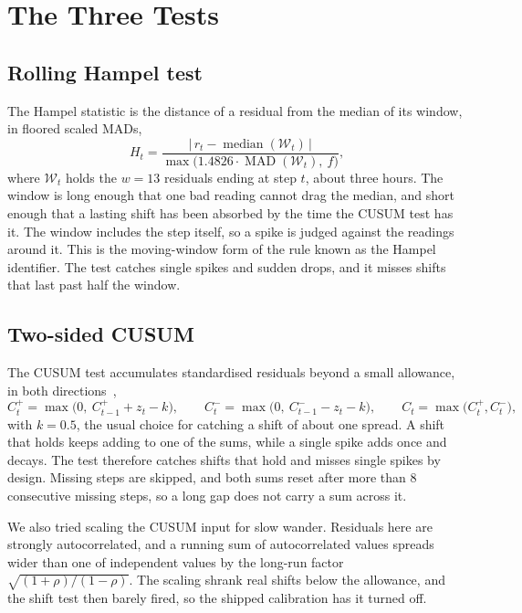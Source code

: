 \documentclass{article}
\begin{document}
\section{The Three Tests}
\label{sec:tests}

\subsection{Rolling Hampel test}
\label{sec:hampel}

The Hampel statistic is the distance of a residual from the median of its
window, in floored scaled MADs,
\begin{equation}
  H_{t} = \frac{\big|\, r_{t} - \operatorname{median}(\mathcal{W}_{t}) \,\big|}
               {\max\!\big(1.4826 \cdot \operatorname{MAD}(\mathcal{W}_{t}),\ f\big)} ,
\end{equation}
where $\mathcal{W}_{t}$ holds the $w = 13$ residuals ending at step $t$, about
three hours. The window is long enough that one bad reading cannot drag the
median, and short enough that a lasting shift has been absorbed by the time the
CUSUM test has it. The window includes the step itself, so a spike is judged
against the readings around it. This is the moving-window form of the rule
known as the Hampel identifier. The test catches single spikes and sudden
drops, and it misses shifts that last past half the window.

\subsection{Two-sided CUSUM}
\label{sec:cusum}

The CUSUM test accumulates standardised residuals beyond a small allowance,
in both directions~\citep{page1954continuous},
\begin{equation}
  C^{+}_{t} = \max\big(0,\ C^{+}_{t-1} + z_{t} - k\big), \qquad
  C^{-}_{t} = \max\big(0,\ C^{-}_{t-1} - z_{t} - k\big), \qquad
  C_{t} = \max\big(C^{+}_{t}, C^{-}_{t}\big),
\end{equation}
with $k = 0.5$, the usual choice for catching a shift of about one spread. A
shift that holds keeps adding to one of the sums, while a single spike adds
once and decays. The test therefore catches shifts that hold and misses single
spikes by design. Missing steps are skipped, and both sums reset after more
than 8 consecutive missing steps, so a long gap does not carry a sum across it.

We also tried scaling the CUSUM input for slow wander. Residuals here are
strongly autocorrelated, and a running sum of autocorrelated values spreads
wider than one of independent values by the long-run factor
$\sqrt{(1 + \rho) / (1 - \rho)}$. The scaling shrank real shifts below the
allowance, and the shift test then barely fired, so the shipped calibration
has it turned off.
\end{document}
